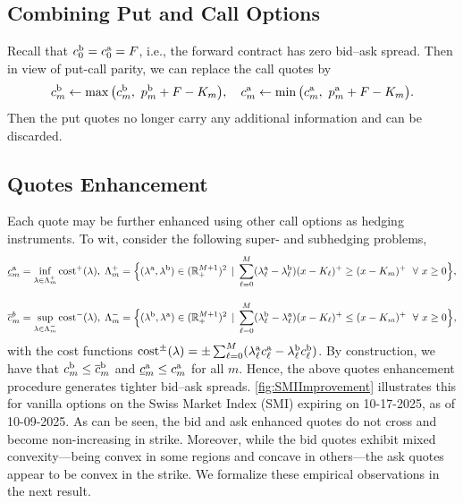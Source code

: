 \documentclass[11pt]{article}
\newcommand{\R}{\mathbb{R}} %
\theoremstyle{plain}
\theoremstyle{definition}
\theoremstyle{remark}
\theoremstyle{plain}
\begin{document}
\subsection{Combining Put and Call Options}\label{sec:putcall}
Recall that $c_0^{\rm b} = c_0^{\rm a} = F$, i.e., the forward contract has zero bid--ask spread. Then in view of put-call parity, we can replace the call quotes by 
\begin{align*}
    c^{\rm b}_m \leftarrow  \max\big(c^{\rm b}_m, \ p^{\rm b}_m + F- K_m\big),  \quad 
    c^{\rm a}_m \leftarrow  \min\big(c^{\rm a}_m, \ p^{\rm a}_m + F- K_m\big).
\end{align*}
Then the put quotes no longer carry any additional information 
and can be  discarded.
%
\subsection{Quotes Enhancement}\label{eq:improve}
Each quote may be further enhanced using other call options as hedging instruments. 
To wit, consider the following super- and subhedging problems, 
\begin{align*}
    \underline{c}^{\rm a}_m &= \inf_{\lambda \in \Lambda_m^{+}} \text{cost}^{+}(\lambda) ,\;  \Lambda_m^{+} = \Big\{(\lambda^{\rm a},\lambda^{\rm b})\in (\R_+^{M+1})^2 \, \mid \, \sum_{\ell=0}^M  (\lambda^{\rm a}_{\ell} - \lambda^{\rm b}_{\ell})(x-K_{\ell})^+ \ge (x-K_m)^+ \; \ \forall \ x\ge 0 \Big\}, \\[1em]
      \overline{c}^b_m &= \sup_{\lambda \in \Lambda_m^{-}} \text{cost}^{-}(\lambda), \;    \Lambda_m^{-} = \Big\{(\lambda^{\rm b},\lambda^{\rm a})\in (\R_+^{M+1})^2 \, \mid \, \sum_{\ell=0}^M  (\lambda^{\rm b}_{\ell} - \lambda^{\rm a}_{\ell})(x-K_{\ell})^+ \le (x-K_{m})^+ \; \ \forall \ x\ge 0 \Big\},
\end{align*}
with the cost functions $\text{cost}^{\pm}(\lambda) = \pm \sum_{\ell=0}^M  (\lambda^{\rm a}_{\ell} c^{\rm a}_{\ell}  - \lambda^{\rm b}_{\ell} c^{\rm b}_{\ell})$. By construction, we have that   $c_m^{\rm b} \le \overline{c}_{m}^{\rm b}$ and $\underline{c}_{m}^{\rm a} \le c_m^{\rm a}$ for all $m$. Hence, the above  quotes enhancement procedure generates tighter bid--ask spreads. 
 \cref{fig:SMIImprovement} illustrates this  for vanilla options on the Swiss Market Index (SMI) expiring on 10-17-2025, as of 10-09-2025. As can be seen, the bid and ask enhanced quotes do not cross and become non-increasing in strike. Moreover, while the bid quotes exhibit mixed convexity---being convex in some regions and concave in others---the ask quotes appear to be convex in the strike. We formalize these empirical observations in the next result. 
%
%
%
%
\end{document}
